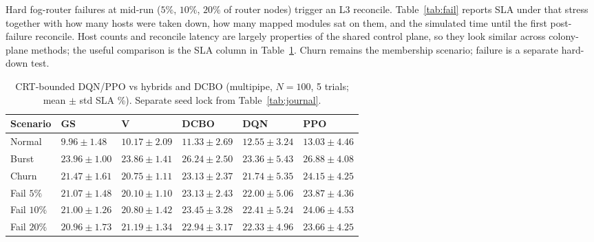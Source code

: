 \documentclass[pdflatex,sn-mathphys-num,iicol]{sn-jnl}
\begin{document}
Hard fog-router failures at mid-run ($5\%$, $10\%$, $20\%$ of router nodes)
trigger an L3 reconcile. Table~\ref{tab:fail} reports SLA under that stress
together with how many hosts were taken down, how many mapped modules sat on
them, and the simulated time until the first post-failure reconcile. Host counts
and reconcile latency are largely properties of the shared control plane, so
they look similar across colony-plane methods; the useful comparison is the SLA
column in Table~\ref{tab:dqnppo}. Churn remains the membership scenario; failure
is a separate hard-down test.

\begin{table}[htbp]
\centering
\caption{CRT-bounded DQN/PPO vs hybrids and DCBO (multipipe, $N{=}100$,
5 trials; mean $\pm$ std SLA \%). Separate seed lock from Table~\ref{tab:journal}.}
\label{tab:dqnppo}
\small
\begin{tabular}{@{}llllll@{}}
\toprule
Scenario & GS & V & DCBO & DQN & PPO \\
\midrule
Normal & $9.96{\pm}1.48$ & $10.17{\pm}2.09$ & $11.33{\pm}2.69$ & $12.55{\pm}3.24$ & $13.03{\pm}4.46$ \\
Burst & $23.96{\pm}1.00$ & $23.86{\pm}1.41$ & $26.24{\pm}2.50$ & $23.36{\pm}5.43$ & $26.88{\pm}4.08$ \\
Churn & $21.47{\pm}1.61$ & $20.75{\pm}1.11$ & $23.13{\pm}2.37$ & $21.74{\pm}5.35$ & $24.15{\pm}4.25$ \\
Fail $5\%$ & $21.07{\pm}1.48$ & $20.10{\pm}1.10$ & $23.13{\pm}2.43$ & $22.00{\pm}5.06$ & $23.87{\pm}4.36$ \\
Fail $10\%$ & $21.00{\pm}1.26$ & $20.80{\pm}1.42$ & $23.45{\pm}3.28$ & $22.41{\pm}5.24$ & $24.06{\pm}4.53$ \\
Fail $20\%$ & $20.96{\pm}1.73$ & $21.19{\pm}1.34$ & $22.94{\pm}3.17$ & $22.33{\pm}4.96$ & $23.66{\pm}4.25$ \\
\bottomrule
\end{tabular}
\end{table}
\end{document}
